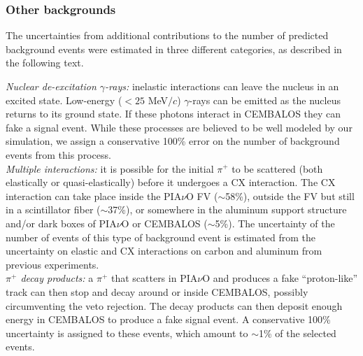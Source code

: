 \subsubsection{\bf Other backgrounds}\label{sec:background}
The uncertainties from additional contributions to the number of predicted background events were estimated in three different categories, as described in the following text.

{ \it Nuclear de-excitation $\gamma$-rays:} inelastic interactions can leave the nucleus in an excited state. Low-energy ($<25$ MeV$/c$) $\gamma$-rays can be emitted as the nucleus returns to its ground state. If these photons interact in CEMBALOS they can fake a signal event. While these processes are believed to be well modeled by our simulation, we assign a conservative 100\% error on the number of background events from this process.\\

{ \it Multiple interactions: } it is possible for the initial $\pi^{+}$ to be scattered (both elastically or quasi-elastically) before it undergoes a CX interaction. The CX interaction can take place inside the PIA$\nu$O FV ($\sim$58\%), outside the FV but still in a scintillator fiber ($\sim$37\%), or somewhere in the aluminum support structure and/or dark boxes of PIA$\nu$O or CEMBALOS ($\sim$5\%). The uncertainty of the number of events of this type of background event is estimated from the uncertainty on elastic and CX interactions on carbon and aluminum from previous experiments.\\

{ \it $\pi^{+}$ decay products: } a $\pi^{+}$ that scatters in PIA$\nu$O and produces a fake ``proton-like'' track can then stop and decay around or inside CEMBALOS, possibly circumventing the veto rejection. The decay products can then deposit enough energy in CEMBALOS to produce a fake signal event. A conservative 100\% uncertainty is assigned to these events, which amount to $\sim$1\% of the selected events. %


